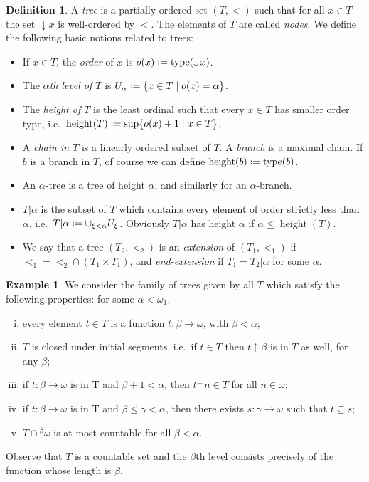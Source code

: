 \documentclass[12pt,a4paper]{report}
\theoremstyle{definition}
\newtheorem{defn}[theorem]{Definition}
\newtheorem{example}[theorem]{Example}
\theoremstyle{num.custom-title}
\DeclareMathOperator{\sse}{\subseteq}
\DeclareMathOperator{\type}{type}
\DeclareMathOperator{\height}{height}
\DeclareMathOperator{\restr}{\upharpoonright}
\DeclareMathOperator{\down}{\downarrow}
\newcommand{\conc}{^\frown}
\newcommand*{\defeq}{\mathrel{\rlap{%
                     \raisebox{0.3ex}{$\cdot$}}%
                     \raisebox{-0.3ex}{$\cdot$}}%
                     =}
\begin{document}
\begin{defn}
A \emph{tree} is a partially ordered set $(T,<)$ such that for all $x \in T$ the set $\down x$ is well-ordered by $<$. The elements of $T$ are called \emph{nodes}. We define the following basic notions related to trees:
\begin{itemize}
\item If $x \in T$, the \emph{order} of $x$ is $o(x) \defeq \type(\down x)$.
\item The \emph{$\alpha$th level of $T$} is $U_\alpha \defeq \{x \in T \mid o(x)=\alpha\}$.
\item The \emph{height of $T$} is the least ordinal such that every $x \in T$ has smaller order type, i.e.\ $\height(T) \defeq \sup\{o(x)+1 \mid x \in T\}$.
\item A \emph{chain in $T$} is a linearly ordered subset of $T$. A \emph{branch} is a maximal chain. If $b$ is a branch in $T$, of course we can define $\height(b) \defeq \type(b)$.
\item An $\alpha$-tree is a tree of height $\alpha$, and similarly for an $\alpha$-branch.
\item $T|\alpha$ is the subset of $T$ which contains every element of order strictly less than $\alpha$, i.e.\ $T|\alpha \defeq \cup_{\xi < \alpha} U_\xi$. Obviously $T|\alpha$ has height $\alpha$ if $\alpha \leq \height(T)$.
\item We say that a tree $(T_2,<_2)$ is an \emph{extension} of $(T_1,<_1)$ if ${<_1} = {<_2} \cap (T_1 \times T_1)$, and \emph{end-extension} if $T_1=T_2|\alpha$ for some $\alpha$.
\end{itemize}
\end{defn}

\begin{example}
We consider the family of trees given by all $T$ which satisfy the following properties: for some $\alpha < \omega_1$,
\begin{enumerate}[(i)]
\item every element $t \in T$ is a function $t \colon \beta \to \omega$, with $\beta < \alpha$;
\item $T$ is closed under initial segments, i.e.\ if $t \in T$ then $t \restr \beta$ is in $T$ as well, for any $\beta$;
\item if $t \colon \beta \to \omega$ is in T and $\beta+1 < \alpha$, then $t \conc n \in T$ for all $n \in \omega$;
\item if $t \colon \beta \to \omega$ is in T and $\beta \leq \gamma < \alpha$, then there exists $s \colon \gamma \to \omega$ such that $t \sse s$;
\item $T \cap {}^{\beta} \omega$ is at most countable for all $\beta < \alpha$.
\end{enumerate}
Observe that $T$ is a countable set and the $\beta$th level consists precisely of the function whose length is $\beta$.
\end{example}
\end{document}
